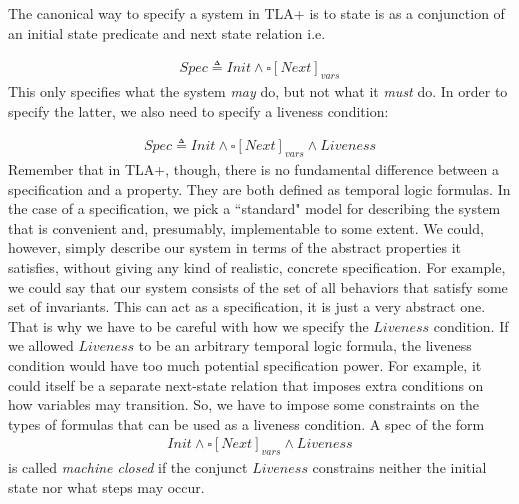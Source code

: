 \documentclass[11pt, oneside]{article}   	%
\begin{document}
The canonical way to specify a system in TLA+ is to state is as a conjunction of an initial state predicate and next state relation i.e.

\begin{align*}
Spec \triangleq  Init \wedge \square[Next]_{vars} 
\end{align*}
This only specifies what the system \textit{may} do, but not what it \textit{must} do. In order to specify the latter, we also need to specify a liveness condition:

\begin{align*}
Spec \triangleq  Init \wedge \square[Next]_{vars} \wedge Liveness
\end{align*}
Remember that in TLA+, though, there is no fundamental difference between a specification and a property. They are both defined as temporal logic formulas. In the case of a specification, we pick a ``standard" model for describing the system that is convenient and, presumably, implementable to some extent. We could, however, simply describe our system in terms of the abstract properties it satisfies, without giving any kind of realistic, concrete specification. For example, we could say that our system consists of the set of all behaviors that satisfy some set of invariants. This can act as a specification, it is just a very abstract one. That is why we have to be careful with how we specify the $Liveness$ condition. If we allowed $Liveness$ to be an arbitrary temporal logic formula, the liveness condition would have too much potential specification power. For example, it could itself be a separate next-state relation that imposes extra conditions on how variables may transition. So, we have to impose some constraints on the types of formulas that can be used as a liveness condition. A spec of the form
\begin{align*}
Init \wedge \square[Next]_{vars} \wedge Liveness
\end{align*}
is called \textit{machine closed} if the conjunct $Liveness$  constrains neither the initial state nor what steps may occur.
\end{document}
